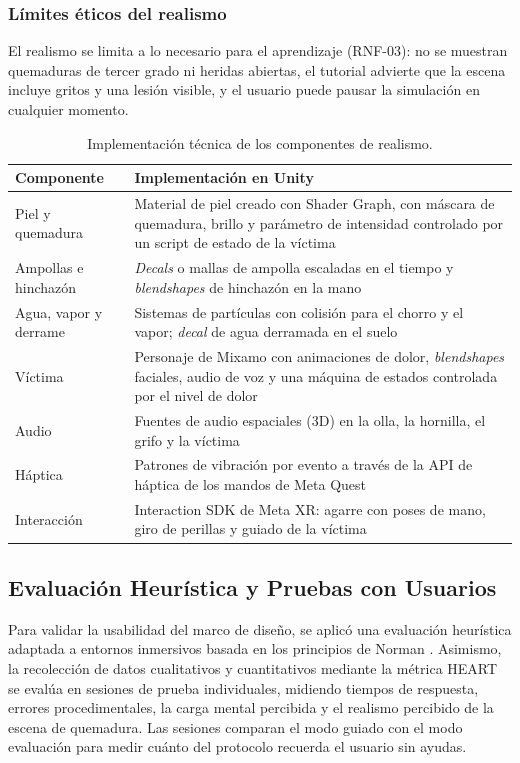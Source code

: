 \documentclass[11pt,letterpaper]{article}
\begin{document}
\subsubsection{Límites éticos del realismo}
El realismo se limita a lo necesario para el aprendizaje (RNF-03): no se muestran quemaduras de tercer grado ni heridas abiertas, el tutorial advierte que la escena incluye gritos y una lesión visible, y el usuario puede pausar la simulación en cualquier momento.

\begin{table}[H]
\centering
\small
\begin{tabularx}{\textwidth}{L{3.2cm} X}
\toprule
\textbf{Componente} & \textbf{Implementación en Unity} \\
\midrule
Piel y quemadura & Material de piel creado con Shader Graph, con máscara de quemadura, brillo y parámetro de intensidad controlado por un script de estado de la víctima \\
Ampollas e hinchazón & \textit{Decals} o mallas de ampolla escaladas en el tiempo y \textit{blendshapes} de hinchazón en la mano \\
Agua, vapor y derrame & Sistemas de partículas con colisión para el chorro y el vapor; \textit{decal} de agua derramada en el suelo \\
Víctima & Personaje de Mixamo con animaciones de dolor, \textit{blendshapes} faciales, audio de voz y una máquina de estados controlada por el nivel de dolor \\
Audio & Fuentes de audio espaciales (3D) en la olla, la hornilla, el grifo y la víctima \\
Háptica & Patrones de vibración por evento a través de la API de háptica de los mandos de Meta Quest \\
Interacción & Interaction SDK de Meta XR: agarre con poses de mano, giro de perillas y guiado de la víctima \\
\bottomrule
\end{tabularx}
\caption{Implementación técnica de los componentes de realismo.}
\label{tab:realismo}
\end{table}

\subsection{Evaluación Heurística y Pruebas con Usuarios}

Para validar la usabilidad del marco de diseño, se aplicó una evaluación heurística adaptada a entornos inmersivos basada en los principios de Norman \cite{norman}. Asimismo, la recolección de datos cualitativos y cuantitativos mediante la métrica HEART se evalúa en sesiones de prueba individuales, midiendo tiempos de respuesta, errores procedimentales, la carga mental percibida y el realismo percibido de la escena de quemadura. Las sesiones comparan el modo guiado con el modo evaluación para medir cuánto del protocolo recuerda el usuario sin ayudas.
\end{document}
